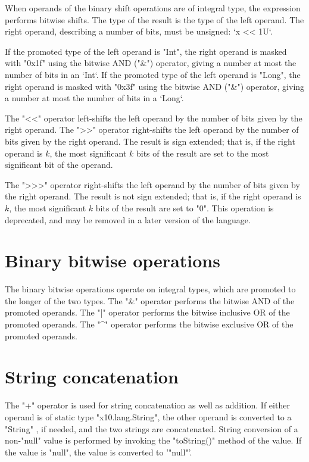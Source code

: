 When operands of the binary shift operations are of integral type, the
expression performs bitwise shifts. 
The type of the result is the type of the left operand.
The right operand, describing a number of bits, must be unsigned: 
\xcd`x << 1U`.  


If the promoted type of the left operand is \xcd"Int",
the right operand is masked with \xcd"0x1f" using the bitwise
AND (\xcd"&") operator, giving a number at most the number of bits in an
\xcd`Int`. 
If the promoted type of the left operand is \xcd"Long",
the right operand is masked with \xcd"0x3f" using the bitwise
AND (\xcd"&") operator, giving a number at most the number of bits in a
\xcd`Long`. 

The \xcd"<<" operator left-shifts the left operand by the number of
bits given by the right operand.
The \xcd">>" operator right-shifts the left operand by the number of
bits given by the right operand.  The result is sign extended;
that is, if the right operand is $k$,
the most significant $k$ bits of the result are set to the most
significant bit of the operand.

The \xcd">>>" operator right-shifts the left operand by the number of
bits given by the right operand.  The result is not sign extended;
that is, if the right operand is $k$,
the most significant $k$ bits of the result are set to \xcd"0".
This operation is deprecated, and may be removed in a later version of the
language. 


\section{Binary bitwise operations}

The binary bitwise operations operate on integral types, which are promoted to
the longer of the two types.
The \xcd"&" operator  performs the bitwise AND of the promoted operands.
The \xcd"|" operator  performs the bitwise inclusive OR of the promoted operands.
The \xcd"^" operator  performs the bitwise exclusive OR of the promoted operands.

\section{String concatenation}

The \xcd"+"  operator is used for string concatenation 
 as well as addition.
If either operand is of static type \xcd"x10.lang.String",
 the other operand is converted to a \xcd"String" , if needed,
  and  the two strings  are concatenated.
 String conversion of a non-\xcd"null" value is  performed by invoking the
 \xcd"toString()" method of the value.
  If the value is \xcd"null", the value is converted to 
  \xcd'"null"'.

